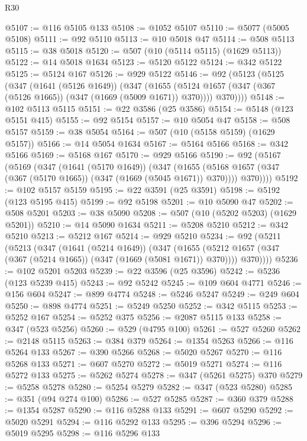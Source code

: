 \begin{lexlean}{R30}
\begin{coremodule}
@5107 := @116 @5105 @133
@5108 := @1052 @5107
@5110 := @5077 (@5005 @5108)
@5111 := @92 @5110
@5113 := @10 @5018 @47
@5114 := @508 @5113
@5115 := @38 @5018
@5120 := @507 (@10 (@5114 @5115) (@1629 @5113))
@5122 := @14 @5018 @1634
@5123 := @5120 @5122
@5124 := @342 @5122
@5125 := @5124 @167
@5126 := @929 @5122
@5146 := @92
    (@5123
      (@5125
        (@347
          (@1641 (@5126 @1649))
          (@347
            (@1655 (@5124 @1657 (@347 (@367 (@5126 @1665)) (@347 (@1669 (@5009 @1671)) @370))))
            @370))))
@5148 := @102 @5113 @5115
@5151 := @22 @3586 (@25 @3586)
@5154 := @5148 (@123 @5151 @415)
@5155 := @92 @5154
@5157 := @10 @5054 @47
@5158 := @508 @5157
@5159 := @38 @5054
@5164 := @507 (@10 (@5158 @5159) (@1629 @5157))
@5166 := @14 @5054 @1634
@5167 := @5164 @5166
@5168 := @342 @5166
@5169 := @5168 @167
@5170 := @929 @5166
@5190 := @92
    (@5167
      (@5169
        (@347
          (@1641 (@5170 @1649))
          (@347
            (@1655 (@5168 @1657 (@347 (@367 (@5170 @1665)) (@347 (@1669 (@5045 @1671)) @370))))
            @370))))
@5192 := @102 @5157 @5159
@5195 := @22 @3591 (@25 @3591)
@5198 := @5192 (@123 @5195 @415)
@5199 := @92 @5198
@5201 := @10 @5090 @47
@5202 := @508 @5201
@5203 := @38 @5090
@5208 := @507 (@10 (@5202 @5203) (@1629 @5201))
@5210 := @14 @5090 @1634
@5211 := @5208 @5210
@5212 := @342 @5210
@5213 := @5212 @167
@5214 := @929 @5210
@5234 := @92
    (@5211
      (@5213
        (@347
          (@1641 (@5214 @1649))
          (@347
            (@1655 (@5212 @1657 (@347 (@367 (@5214 @1665)) (@347 (@1669 (@5081 @1671)) @370))))
            @370))))
@5236 := @102 @5201 @5203
@5239 := @22 @3596 (@25 @3596)
@5242 := @5236 (@123 @5239 @415)
@5243 := @92 @5242
@5245 := @109 @604 @4771
@5246 := @156 @604
@5247 := @899 @4774
@5248 := @5246 @5247
@5249 := @249 @604
@5250 := @898 @4774
@5251 := @5249 @5250
@5252 := @342 @5115
@5253 := @5252 @167
@5254 := @5252 @375
@5256 := @2087 @5115 @133
@5258 := @347 (@523 @5256)
@5260 := @529 (@4795 @100)
@5261 := @527 @5260
@5262 := @2148 @5115
@5263 := @384 @379
@5264 := @1354 @5263
@5266 := @116 @5264 @133
@5267 := @390 @5266
@5268 := @5020 @5267
@5270 := @116 @5268 @133
@5271 := @607 @5270
@5272 := @5019 @5271
@5274 := @116 @5272 @133
@5275 := @5262 @5274
@5278 := @347 (@5261 @5275) @370
@5279 := @5258 @5278
@5280 := @5254 @5279
@5282 := @347 (@523 @5280)
@5285 := @351 (@94 @274 @100)
@5286 := @527 @5285
@5287 := @360 @379
@5288 := @1354 @5287
@5290 := @116 @5288 @133
@5291 := @607 @5290
@5292 := @5020 @5291
@5294 := @116 @5292 @133
@5295 := @396 @5294
@5296 := @5019 @5295
@5298 := @116 @5296 @133

\end{coremodule}
\end{lexlean}

